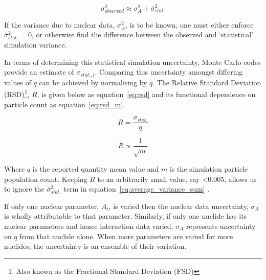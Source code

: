 \begin{equation}
  \label{eq:average_variance_sum}
  \sigma_{observed}^{2} \approx \sigma_{A}^{2} + \overline{\sigma}_{stat.}^{2}
\end{equation}

If the variance due to nuclear data, $\sigma_{A}^{2}$, is to be known, one must either enforce $\overline{\sigma}_{stat.}^{2} = 0$, or otherwise find the difference between the observed and `statistical' simulation variance. 

In terms of determining this statistical simulation uncertainty, Monte Carlo codes provide an estimate of $\sigma_{stat.,i}$. Comparing this uncertainty amongst differing values of $q$ can be achieved by normalising by $q$. The Relative Standard Deviation (RSD)\footnote{Also known as the Fractional Standard Deviation (FSD)}, $R$, is given below as equation~\ref{eq:rsd} and its functional dependence on particle count as equation~\ref{eq:rsd_m}.

\begin{equation}
  \label{eq:rsd}
  R = \frac{\sigma_{stat.}}{q}
\end{equation}

\begin{equation}
  \label{eq:rsd_m}
  R \propto \frac{1}{\sqrt{m}}
\end{equation}

Where $q$ is the reported quantity mean value and $m$ is the simulation particle population count. Keeping $R$ to an arbitrarily small value, say <0.005, allows us to ignore the $\overline{\sigma}_{stat.}^{2}$ term in equation~\ref{eq:average_variance_sum} \cite{Rochman2014a}.

If only one nuclear parameter, $A_{i}$, is varied then the nuclear data uncertainty, $\sigma_{A}$ is wholly attributable to that parameter. Similarly, if only one nuclide has its nuclear parameters and hence interaction data varied, $\sigma_{A}$ represents uncertainty on $q$ from that nuclide alone. When more parameters are varied for more nuclides, the uncertainty is an ensemble of their variation. 


